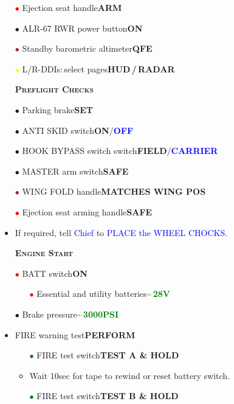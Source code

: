 \documentclass[a4paper,12pt,dvipsnames]{letter}
\newcommand{\radio}[1]{\textcolor{blue}{#1}}
\newcommand{\button}[1]{\textbf{#1}}
\newcommand{\ok}[1]{\textcolor{Green}{\textbf{#1}}}
\newcommand{\boat}[1]{\textcolor{Blue}{\textbf{#1}}}
\newcommand{\myHead}[1]{{\LARGE\textsc{\textbf{#1}}}}
\newcommand{\bi}{\textcolor{ProcessBlue}{$\bullet$\;}}
\newcommand{\ri}{\textcolor{Red}{$\bullet$\;}}
\newcommand{\gi}{\textcolor{Green}{$\bullet$\;}}
\newcommand{\yi}{\textcolor{Yellow}{$\bullet$\;}}
\newcommand{\ai}{\textcolor{Apricot}{$\bullet$\;}}
\renewcommand{\ni}{\textcolor{Brown}{$\bullet$\;}}
\begin{document}
{\begin{itemize}
 \item[\ri] Ejection seat handle\dotfill\button{ARM}
 \item[\ai] ALR-67 RWR power button\dotfill\button{ON}
 \item[\ni] Standby barometric altimeter\dotfill\button{QFE}
 \item[\yi] L/R-DDIs:\,select pages\dotfill\button{HUD\,/\,RADAR}
\end{itemize}
\newpage
\begin{itemize}
 \item[] \myHead{Preflight Checks}
 \item[\bi] Parking brake\dotfill\button{SET}
 \item[\bi] ANTI SKID switch\dotfill\button{ON}/\boat{OFF}
 \item[\bi] HOOK BYPASS switch switch\dotfill\button{FIELD}/\boat{CARRIER}
 \item[\bi] MASTER arm switch\dotfill\button{SAFE}
 \item[\ni] WING FOLD handle\dotfill\button{MATCHES WING POS}
 \item[\ri] Ejection seat arming handle\dotfill\button{SAFE}
 \item If required, tell \radio{Chief} to \radio{PLACE the WHEEL CHOCKS}.
\end{itemize}
\vspace{0.5em}
\begin{itemize}
 \item[] \myHead{Engine Start} 
 \item[\ri] BATT switch\dotfill\button{ON}
 \begin{itemize}
  \item[\ri] Essential and utility batteries\dotfill\ok{\textasciitilde\,28\;V}
 \end{itemize}
 \item[\bi] Brake pressure\dotfill\ok{\textasciitilde\,3000\;PSI}
 \item FIRE warning test\dotfill\button{PERFORM}
 \begin{itemize}
  \item[\gi] FIRE test switch\dotfill\button{TEST A \& HOLD}
  \item Wait 10\;sec for tape to rewind or reset battery switch.
  \item[\gi] FIRE test switch\dotfill\button{TEST B \& HOLD}

\end{itemize}
\end{itemize}}
\end{document}
